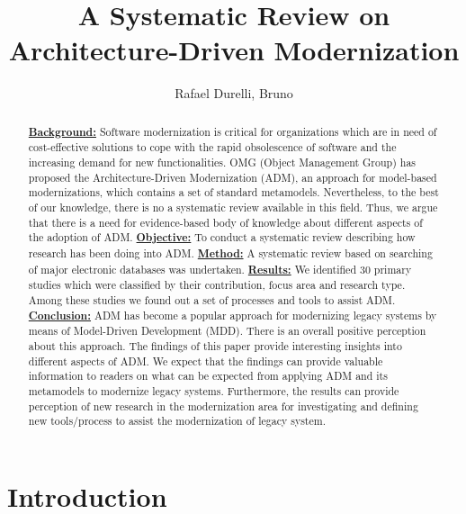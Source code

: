 \documentclass{llncs}
\begin{document}
\title{A Systematic Review on Architecture-Driven Modernization}

\author{Rafael Durelli, Bruno}

\maketitle

\begin{abstract}

\underline{\textbf{Background:}} Software modernization is critical for organizations which are in need of cost-effective solutions to cope with the rapid obsolescence of software and the increasing demand for new functionalities. OMG (Object Management Group) has proposed the Architecture-Driven Modernization (ADM), an approach for model-based modernizations, which contains a set of standard metamodels. Nevertheless, to the best of our knowledge, there is no a systematic review available in this field. Thus, we argue that there is a need for evidence-based body of knowledge about different aspects of the adoption of ADM.
\underline{\textbf{Objective:}} To conduct a systematic review describing how research has been doing into ADM. \underline{\textbf{Method:}} A systematic review based on searching of major electronic databases was undertaken. \underline{\textbf{Results:}} We identified 30 primary studies which were classified by their contribution, focus area and research type. Among these studies we found out a set of processes and tools to assist ADM. \underline{\textbf{Conclusion:}} ADM has become a popular approach for modernizing legacy systems by means of Model-Driven Development (MDD). There is an overall positive perception about this approach. The findings of this paper provide interesting insights into different aspects of ADM. We expect that the findings can provide valuable information to readers on what can be expected from applying ADM and its metamodels to modernize legacy systems. Furthermore, the results can provide perception of new research in the modernization area for investigating and defining new tools/process to assist the modernization of legacy system.

\end{abstract}

\section{Introduction}\label{sec:Introduction}
\linespread{0.87}

\end{document}
